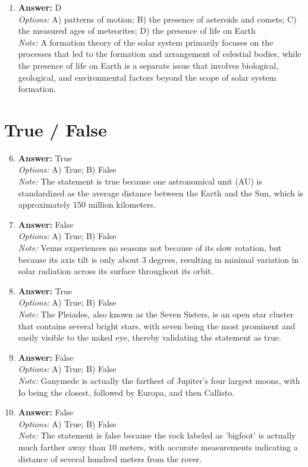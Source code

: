 \documentclass[12pt]{article}
\begin{document}
\begin{enumerate}[label=\arabic*.]
\item \textbf{Answer:} D
\\ \textit{Options:} A) patterns of motion; B) the presence of asteroids and comets; C) the measured ages of meteorites; D) the presence of life on Earth
\\ \textit{Note:} A formation theory of the solar system primarily focuses on the processes that led to the formation and arrangement of celestial bodies, while the presence of life on Earth is a separate issue that involves biological, geological, and environmental factors beyond the scope of solar system formation.
\end{enumerate}

\section*{True / False}
\begin{enumerate}[label=\arabic*.]
\setcounter{enumi}{5}
\item \textbf{Answer:} True
\\ \textit{Options:} A) True; B) False
\\ \textit{Note:} The statement is true because one astronomical unit (AU) is standardized as the average distance between the Earth and the Sun, which is approximately 150 million kilometers.
\item \textbf{Answer:} False
\\ \textit{Options:} A) True; B) False
\\ \textit{Note:} Venus experiences no seasons not because of its slow rotation, but because its axis tilt is only about 3 degrees, resulting in minimal variation in solar radiation across its surface throughout its orbit.
\item \textbf{Answer:} True
\\ \textit{Options:} A) True; B) False
\\ \textit{Note:} The Pleiades, also known as the Seven Sisters, is an open star cluster that contains several bright stars, with seven being the most prominent and easily visible to the naked eye, thereby validating the statement as true.
\item \textbf{Answer:} False
\\ \textit{Options:} A) True; B) False
\\ \textit{Note:} Ganymede is actually the farthest of Jupiter's four largest moons, with Io being the closest, followed by Europa, and then Callisto.
\item \textbf{Answer:} False
\\ \textit{Options:} A) True; B) False
\\ \textit{Note:} The statement is false because the rock labeled as 'bigfoot' is actually much farther away than 10 meters, with accurate measurements indicating a distance of several hundred meters from the rover.
\end{enumerate}
\end{document}

